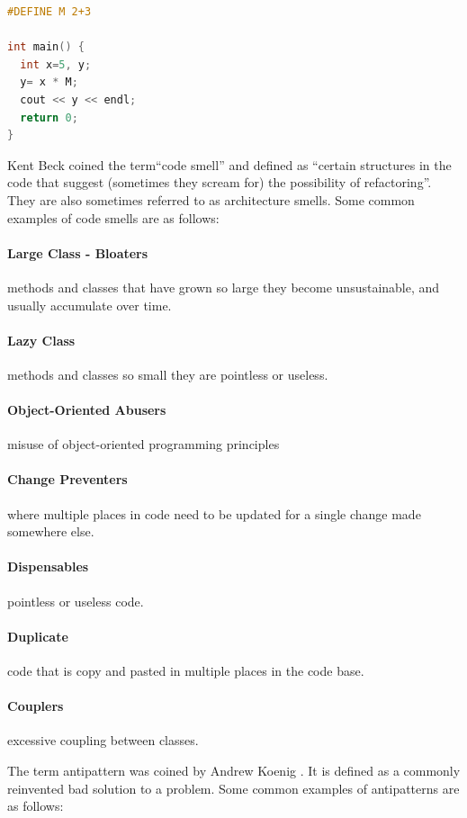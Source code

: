 \documentclass[conference]{IEEEtran}
\begin{document}
\begin{lstlisting}[language=C,frame=single,caption=Example Atom of Confusion,label=pattern1]
#DEFINE M 2+3

int main() {
  int x=5, y;
  y= x * M;
  cout << y << endl;
  return 0;
}
\end{lstlisting}

Kent Beck coined the term``code smell'' \cite{fowler_refactoring:_2018} and defined as ``certain structures in the code that suggest (sometimes they scream for) the possibility of refactoring''. They are also sometimes referred to as architecture smells.
Some common examples of code smells are as follows:
\paragraph{Large Class - Bloaters} methods and classes that have grown so large they become unsustainable, and usually accumulate over time.
\paragraph{Lazy Class} methods and classes so small they are pointless or useless.
\paragraph{Object-Oriented Abusers} misuse of object-oriented programming principles
\paragraph{Change Preventers} where multiple places in code need to be updated for a single change made somewhere else.
\paragraph{Dispensables} pointless or useless code.
\paragraph{Duplicate} code that is copy and pasted in multiple places in the code base.
\paragraph{Couplers} excessive coupling between classes.

The term antipattern was coined by Andrew Koenig \cite{koenig_patterns_1998}. 
It is defined as a commonly reinvented bad solution to a problem.
Some common examples of antipatterns are as follows:
\end{document}
